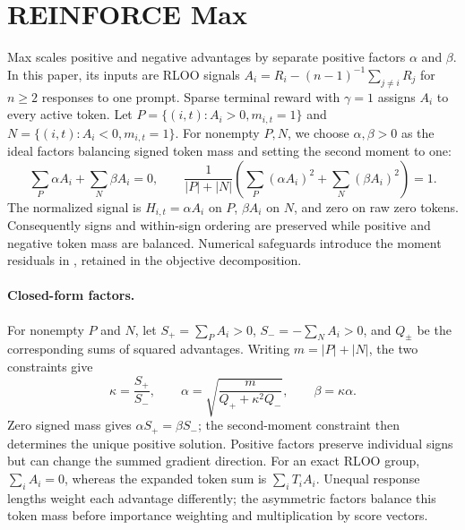 \section{REINFORCE Max}
Max scales positive and negative advantages by separate positive factors
$\alpha$ and $\beta$. In this paper, its inputs are RLOO signals
$A_i=R_i-(n-1)^{-1}\sum_{j\ne i}R_j$ for $n\ge2$ responses to one prompt.
Sparse terminal reward with $\gamma=1$ assigns $A_i$ to every active token.
Let $P=\{(i,t):A_i>0,m_{i,t}=1\}$ and
$N=\{(i,t):A_i<0,m_{i,t}=1\}$. For nonempty $P,N$, we choose $\alpha,\beta>0$
as the ideal factors balancing signed token mass and setting the second moment to one:
\[
 \sum_{P}\alpha A_i+\sum_N\beta A_i=0,\qquad
 \frac{1}{|P|+|N|}\left(\sum_P(\alpha A_i)^2+\sum_N(\beta A_i)^2\right)=1.
\]
The normalized signal is $H_{i,t}=\alpha A_i$ on $P$, $\beta A_i$ on $N$,
and zero on raw zero tokens. Consequently signs and within-sign ordering are
preserved while positive and negative token mass are balanced. Numerical safeguards introduce the moment residuals in
, retained in the objective decomposition.

\paragraph{Closed-form factors.}
For nonempty $P$ and $N$, let $S_+=\sum_P A_i>0$,
$S_-=-\sum_N A_i>0$, and $Q_\pm$ be the corresponding sums of squared
advantages. Writing $m=|P|+|N|$, the two constraints give
\[
 \kappa=\frac{S_+}{S_-},\qquad
 \alpha=\sqrt{\frac{m}{Q_++\kappa^2Q_-}},\qquad
 \beta=\kappa\alpha.
\]
Zero signed mass gives $\alpha S_+=\beta S_-$; the second-moment
constraint then determines the unique positive solution. Positive factors
preserve individual signs but can change the summed gradient direction.
For an exact RLOO group, $\sum_i A_i=0$, whereas the expanded
token sum is $\sum_i T_iA_i$. Unequal response lengths weight each
advantage differently; the asymmetric factors balance this token mass
before importance weighting and multiplication by score vectors.

